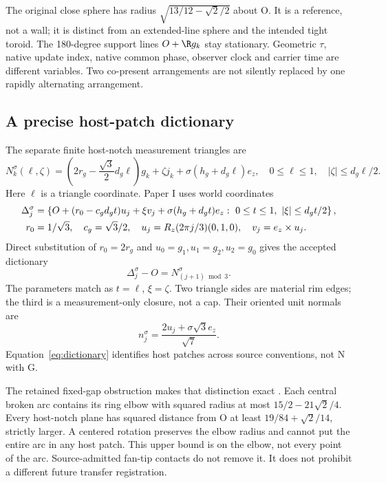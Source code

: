 The original close sphere has radius $\sqrt{13/12-\sqrt2/2}$ about O. It is a reference, not a wall; it is distinct from an extended-line sphere and the intended tight toroid. The 180-degree support lines $O+\R g_k$ stay stationary. Geometric $\tau$, native update index, native common phase, observer clock and carrier time are different variables. Two co-present arrangements are not silently replaced by one rapidly alternating arrangement.

\subsection{A precise host-patch dictionary}
The separate finite host-notch measurement triangles are
\begin{equation}\label{eq:N}
 N_k^\sigma(\ell,\zeta)=
 \left(2r_g-\frac{\sqrt3}{2}d_g\ell\right)g_k+\zeta j_k
       +\sigma(h_g+d_g\ell)e_z,
 \quad0\le\ell\le1,\quad|\zeta|\le d_g\ell/2.
\end{equation}
Here $\ell$ is a triangle coordinate. Paper I \cite{pairedI} uses world coordinates
\begin{align}
 \Delta_j^\sigma&=\left\{O+(r_0-c_gd_gt)u_j+\xi v_j
                +\sigma(h_g+d_gt)e_z:\ 0\le t\le1,\ |\xi|\le d_gt/2\right\},\notag\\
 r_0&=1/\sqrt3,\quad c_g=\sqrt3/2,\quad
 u_j=R_z(2\pi j/3)(0,1,0),\quad v_j=e_z\times u_j.\label{eq:Delta}
\end{align}
Direct substitution of $r_0=2r_g$ and $u_0=g_1,u_1=g_2,u_2=g_0$ gives the accepted dictionary
\begin{equation}\label{eq:dictionary}
 \boxed{\Delta_j^\sigma-O=N_{(j+1)\bmod3}^\sigma.}
\end{equation}
The parameters match as $t=\ell$, $\xi=\zeta$. Two triangle sides are material rim edges; the third is a measurement-only closure, not a cap. Their oriented unit normals are
\begin{equation}\label{eq:normals}
 n_j^\sigma=\frac{2u_j+\sigma\sqrt3 e_z}{\sqrt7}.
\end{equation}
Equation~\eqref{eq:dictionary} identifies host patches across source conventions, not N with G.

The retained fixed-gap obstruction makes that distinction exact \cite[boundary obstruction]{fixedgap}. Each central broken arc contains its ring elbow with squared radius at most $15/2-21\sqrt2/4$. Every host-notch plane has squared distance from O at least $19/84+\sqrt2/14$, strictly larger. A centered rotation preserves the elbow radius and cannot put the entire arc in any host patch. This upper bound is on the elbow, not every point of the arc. Source-admitted fan-tip contacts do not remove it. It does not prohibit a different future transfer registration.

